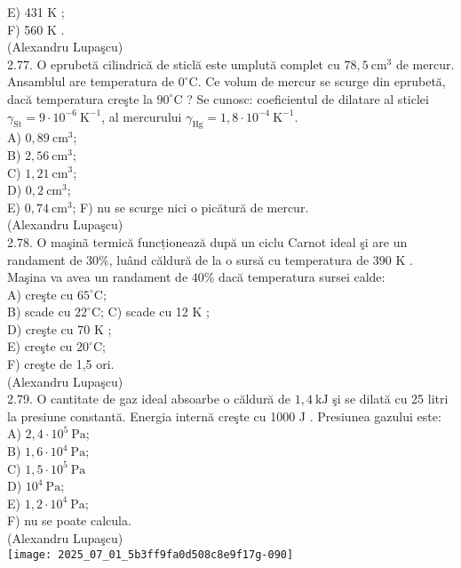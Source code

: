 E) 431 K ;\\
F) 560 K .\\
(Alexandru Lupaşcu)\\
2.77. O eprubetă cilindrică de sticlă este umplută complet cu $78,5 \mathrm{~cm}^{3}$ de mercur. Ansamblul are temperatura de $0^{\circ} \mathrm{C}$. Ce volum de mercur se scurge din eprubetă, dacă temperatura creşte la $90^{\circ} \mathrm{C}$ ? Se cunosc: coeficientul de dilatare al sticlei $\gamma_{\mathrm{St}}=9 \cdot 10^{-6} \mathrm{~K}^{-1}$, al mercurului $\gamma_{\mathrm{Hg}}=1,8 \cdot 10^{-4} \mathrm{~K}^{-1}$.\\
A) $0,89 \mathrm{~cm}^{3}$;\\
B) $2,56 \mathrm{~cm}^{3}$;\\
C) $1,21 \mathrm{~cm}^{3}$;\\
D) $0,2 \mathrm{~cm}^{3}$;\\
E) $0,74 \mathrm{~cm}^{3}$; F) nu se scurge nici o picătură de mercur.\\
(Alexandru Lupaşcu)\\
2.78. O maşinã termică funcționează după un ciclu Carnot ideal şi are un randament de $30 \%$, luând căldură de la o sursă cu temperatura de 390 K . Maşina va avea un randament de $40 \%$ dacă temperatura sursei calde:\\
A) creşte cu $65^{\circ} \mathrm{C}$;\\
B) scade cu $22^{\circ} \mathrm{C}$; C) scade cu 12 K ;\\
D) creşte cu 70 K ;\\
E) creşte cu $20^{\circ} \mathrm{C}$;\\
F) creşte de 1,5 ori.\\
(Alexandru Lupaşcu)\\
2.79. O cantitate de gaz ideal absoarbe o căldură de $1,4 \mathrm{~kJ}$ şi se dilată cu 25 litri la presiune constantă. Energia internă creşte cu 1000 J . Presiunea gazului este:\\
A) $2,4 \cdot 10^{5} \mathrm{~Pa}$;\\
B) $1,6 \cdot 10^{4} \mathrm{~Pa}$;\\
C) $1,5 \cdot 10^{5} \mathrm{~Pa}$\\
D) $10^{4} \mathrm{~Pa}$;\\
E) $1,2 \cdot 10^{4} \mathrm{~Pa}$;\\
F) nu se poate calcula.\\
(Alexandru Lupaşcu)\\
\texttt{[image: 2025\_07\_01\_5b3ff9fa0d508c8e9f17g-090]}

